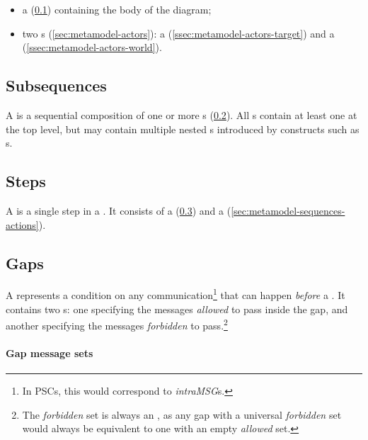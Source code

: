 \begin{itemize}
\item
	a \msubsequence{} (\cref{ssec:metamodel-sequences-subsequences})
	containing the body of the diagram;
\item
	two \mactor s (\cref{sec:metamodel-actors}):
	a \mtargetactor{} (\cref{ssec:metamodel-actors-target})
	and a \mworld{} (\cref{ssec:metamodel-actors-world}).
\end{itemize}

\subsection{Subsequences}\label{ssec:metamodel-sequences-subsequences}

A \msubsequence{} is a sequential composition of one or more \msequencestep s
(\cref{ssec:metamodel-sequences-steps}).
All \msequence s contain at least one \msubsequence{} at the top level, but
may contain multiple nested \msubsequence s introduced by constructs such as
\mloopaction s.

\subsection{Steps}\label{ssec:metamodel-sequences-steps}

A \msequencestep{} is a single step in a \msubsequence.  It consists of a
\msequencegap{} (\cref{ssec:metamodel-sequences-gaps}) and a
\msequenceaction{} (\cref{sec:metamodel-sequences-actions}).

\subsection{Gaps}\label{ssec:metamodel-sequences-gaps}

A \msequencegap{} represents a condition on any communication\footnote{In PSCs,
this would correspond to \emph{intraMSG}s.} that can happen
\emph{before} a \msequenceaction.  
It contains two \mgapmessageset s: one specifying the messages
\emph{allowed} to pass inside the gap, and another specifying the messages
\emph{forbidden} to pass.\footnote{The \emph{forbidden} set is always an
\mextensionalgapmessageset, as any gap with a universal
\emph{forbidden} set would always be equivalent to one with an empty
\emph{allowed} set.
}

\paragraph{Gap message sets}

